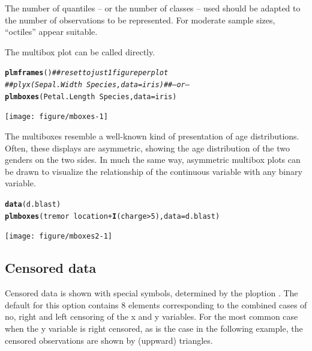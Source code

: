 \documentclass[11pt]{article}\usepackage[]{graphicx}\usepackage[]{color}
\makeatletter
\newcommand{\hlnum}[1]{\textcolor[rgb]{0.686,0.059,0.569}{#1}}%
\newcommand{\hlcom}[1]{\textcolor[rgb]{0.678,0.584,0.686}{\textit{#1}}}%
\newcommand{\hlopt}[1]{\textcolor[rgb]{0,0,0}{#1}}%
\newcommand{\hlstd}[1]{\textcolor[rgb]{0.345,0.345,0.345}{#1}}%
\newcommand{\hlkwc}[1]{\textcolor[rgb]{0.333,0.667,0.333}{#1}}%
\newcommand{\hlkwd}[1]{\textcolor[rgb]{0.737,0.353,0.396}{\textbf{#1}}}%
\newenvironment{kframe}{%
 \def\at@end@of@kframe{}%
 \ifinner\ifhmode%
  \def\at@end@of@kframe{\end{minipage}}%
  \begin{minipage}{\columnwidth}%
 \fi\fi%
 \def\FrameCommand##1{\hskip\@totalleftmargin \hskip-\fboxsep
 \colorbox{shadecolor}{##1}\hskip-\fboxsep
     \hskip-\linewidth \hskip-\@totalleftmargin \hskip\columnwidth}%
 \MakeFramed {\advance\hsize-\width
   \@totalleftmargin\z@ \linewidth\hsize
   \@setminipage}}%
 {\par\unskip\endMakeFramed%
 \at@end@of@kframe}
\newenvironment{knitrout}{}{} %
\makeatother
\begin{document}
The number of quantiles -- or the number of classes -- used should be
adapted to the number of observations to be represented.
For moderate sample sizes, ``octiles'' appear suitable.

The multibox plot can be called directly.
\begin{knitrout}
\color{fgcolor}\begin{kframe}
\begin{alltt}
\hlkwd{plmframes}\hlstd{()}  \hlcom{## reset to just 1 figure per plot}
\hlcom{## plyx(Sepal.Width~Species, data=iris)  ## -- or --}
\hlkwd{plmboxes}\hlstd{(Petal.Length}\hlopt{~}\hlstd{Species,} \hlkwc{data}\hlstd{=iris)}
\end{alltt}
\end{kframe}
\texttt{[image: figure/mboxes-1]} 
\end{knitrout}

The multiboxes %
resemble a well-known kind of
presentation of age distributions. Often, these displays are asymmetric,
showing the age distribution of the two genders on the two sides.
In much the same way, asymmetric multibox plots can be drawn to visualize
the relationship of the continuous variable with any binary variable.
\begin{knitrout}
\color{fgcolor}\begin{kframe}
\begin{alltt}
\hlkwd{data}\hlstd{(d.blast)}
\hlkwd{plmboxes}\hlstd{(tremor}\hlopt{~}\hlstd{location}\hlopt{+}\hlkwd{I}\hlstd{(charge}\hlopt{>}\hlnum{5}\hlstd{),} \hlkwc{data}\hlstd{=d.blast)}
\end{alltt}
\end{kframe}
\texttt{[image: figure/mboxes2-1]} 
\end{knitrout}

\subsection{Censored data}
\label{sec:censored}
Censored data is shown with special symbols, determined by the ploption
\linebreak[3]
. The default for this option contains 8 elements
corresponding to the combined cases of no, right and left censoring of 
the x and y variables. 
For the most common case when the y variable is right censored, 
as is the case in the following example, the censored observations are
shown by (uppward) triangles.
\end{document}
